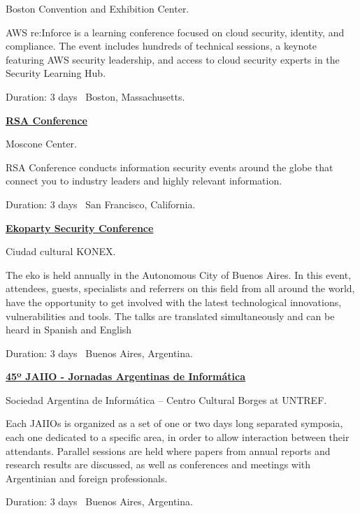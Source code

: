 \documentclass[letterpaper,MMMyyyy,nonstop]{simpleresumecv}
\begin{document}
\begin{body}
\BulletItem Boston Convention and Exhibition Center.
\begin{detail}
	\SubBulletItem
	AWS re:Inforce is a learning conference focused on cloud security, identity, and compliance. The event includes hundreds of technical sessions, a keynote featuring AWS security leadership, and access to cloud security experts in the Security Learning Hub.

\end{detail}
Duration: 3 days \SubBulletSymbol\, Boston, Massachusetts.

\BigGap

\href{https://www.rsaconference.com/events/us18}{\textbf{RSA Conference}}
\hfill
{}

\BulletItem Moscone Center.
\begin{detail}
	\SubBulletItem
	RSA Conference conducts information security events around the globe that connect you to industry leaders and highly relevant information.
\end{detail}
Duration: 3 days \SubBulletSymbol\, San Francisco, California.

\BigGap

\href{https://www.ekoparty.org/acerca-ekoparty.php}{\textbf{Ekoparty Security Conference}}
\hfill
{}

\BulletItem Ciudad cultural KONEX.
\begin{detail}
	\SubBulletItem
	The eko is held annually in the Autonomous City of Buenos Aires. In this event, attendees, guests, specialists and referrers on this field from all around the world, have the opportunity to get involved with the latest technological innovations, vulnerabilities and tools. The talks are translated simultaneously and can be heard in Spanish and English
\end{detail}
Duration: 3 days \SubBulletSymbol\, Buenos Aires, Argentina.

\BigGap

\href{http://45jaiio.sadio.org.ar/}{\textbf{45º JAIIO - Jornadas Argentinas de Informática}}
\hfill
{}

\BulletItem Sociedad Argentina de Informática – Centro Cultural Borges at UNTREF.
\begin{detail}
	\SubBulletItem
	Each JAIIOs is organized as a set of one or two days long separated symposia, each one dedicated to a specific area, in order to allow interaction between their attendants. Parallel sessions are held where papers from annual reports and research results are discussed, as well as conferences and meetings with Argentinian and foreign professionals.
\end{detail}
Duration: 3 days \SubBulletSymbol\, Buenos Aires, Argentina.


\end{body}
\end{document}
